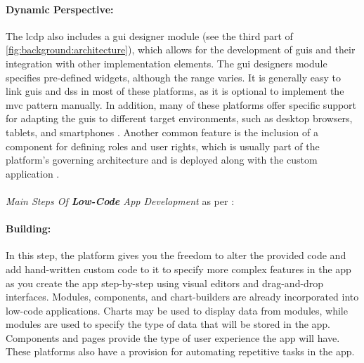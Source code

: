 \paragraph*{Dynamic Perspective:}
The \ac{lcdp} also includes a \ac{gui} designer module (see the third part of \ref{fig:background:architecture}), which allows for the development of \ac{gui}s and their integration with other implementation elements. 
The \ac{gui} designers module specifies pre-defined widgets, although the range varies. 
It is generally easy to link \ac{gui}s and \ac{ds}s in most of these platforms, as it is optional to implement the \ac{mvc} pattern manually.
In addition, many of these platforms offer specific support for adapting the \ac{gui}s to different target environments, such as desktop browsers, tablets, and smartphones \cite{paper:lowcode:cabot}.
Another common feature is the inclusion of a component for defining roles and user rights, which is usually part of the platform's governing architecture and is deployed along with the custom application \cite{article:nocode:sahina}.\\\\
\textit{Main Steps Of \textbf{Low-Code} App Development} as per \cite{misc:lowcode:steps}:
\paragraph*{Building:}
In this step, the platform gives you the freedom to alter the provided code and add hand-written custom code to it to specify more complex features in the app as you create the app step-by-step using visual editors and drag-and-drop interfaces.
Modules, components, and chart-builders are already incorporated into low-code applications. 
Charts may be used to display data from modules, while modules are used to specify the type of data that will be stored in the app. 
Components and pages provide the type of user experience the app will have.
These platforms also have a provision for automating repetitive tasks in the app.
